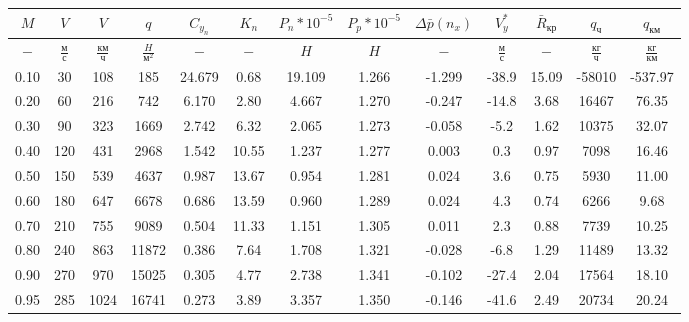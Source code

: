 \begin{tabular}{|c|c|c|c|c|c|c|c|c|c|c|c|c|}
\hline
$M$ & $V$ & $V$ & $q$ & $C_{y_n}$ & $K_n$ & $P_n*10^{-5}$ & $P_p*10^{-5}$ & $\Delta \bar{p}(n_x)$ & $V_y^*$ & $\bar{R}_{кр}$ & $q_{ч}$ & $q_{км}$ \\ 
\hline
$-$ & $\frac{м}{с}$ & $\frac{км}{ч}$ & $\frac{H}{м^2}$ & $-$ & $-$ & $H$ & $H$ & $-$ & $\frac{м}{с}$ & $-$ & $\frac{кг}{ч}$ & $\frac{кг}{км}$ \\ 
\hline
0.10 & 30 & 108 & 185 & 24.679 & 0.68 & 19.109 & 1.266 & -1.299 & -38.9 & 15.09 & -58010 & -537.97 \\ 
\hline
0.20 & 60 & 216 & 742 & 6.170 & 2.80 & 4.667 & 1.270 & -0.247 & -14.8 & 3.68 & 16467 & 76.35 \\ 
\hline
0.30 & 90 & 323 & 1669 & 2.742 & 6.32 & 2.065 & 1.273 & -0.058 & -5.2 & 1.62 & 10375 & 32.07 \\ 
\hline
0.40 & 120 & 431 & 2968 & 1.542 & 10.55 & 1.237 & 1.277 & 0.003 & 0.3 & 0.97 & 7098 & 16.46 \\ 
\hline
0.50 & 150 & 539 & 4637 & 0.987 & 13.67 & 0.954 & 1.281 & 0.024 & 3.6 & 0.75 & 5930 & 11.00 \\ 
\hline
0.60 & 180 & 647 & 6678 & 0.686 & 13.59 & 0.960 & 1.289 & 0.024 & 4.3 & 0.74 & 6266 & 9.68 \\ 
\hline
0.70 & 210 & 755 & 9089 & 0.504 & 11.33 & 1.151 & 1.305 & 0.011 & 2.3 & 0.88 & 7739 & 10.25 \\ 
\hline
0.80 & 240 & 863 & 11872 & 0.386 & 7.64 & 1.708 & 1.321 & -0.028 & -6.8 & 1.29 & 11489 & 13.32 \\ 
\hline
0.90 & 270 & 970 & 15025 & 0.305 & 4.77 & 2.738 & 1.341 & -0.102 & -27.4 & 2.04 & 17564 & 18.10 \\ 
\hline
0.95 & 285 & 1024 & 16741 & 0.273 & 3.89 & 3.357 & 1.350 & -0.146 & -41.6 & 2.49 & 20734 & 20.24 \\ 
\hline
\end{tabular}